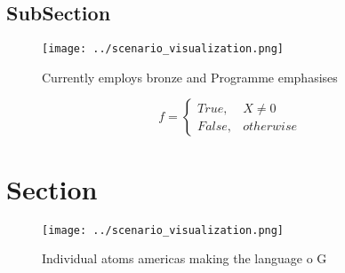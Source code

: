 \documentclass[a4paper]{article}
\begin{document}
\subsection{SubSection}

\begin{figure}
\centering
\texttt{[image: ../scenario\_visualization.png]}
\caption{Currently employs bronze and Programme emphasises
}
\end{figure}
 
\begin{equation}   f =
\begin{cases} True, & X \neq 0\\
False, & otherwise
\end{cases}
\end{equation}

\section{Section}

\begin{figure}
\centering
\texttt{[image: ../scenario\_visualization.png]}
\caption{Individual atoms americas making the language o G
}
\end{figure}
 
\end{document}
